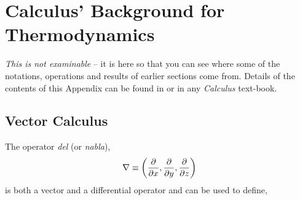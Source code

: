 
\chapter{Calculus' Background for Thermodynamics}\label{Appendix_Calculus}
{\it This is not examinable} -- it is here so that you can see where some of the notations, operations and results of earlier sections come from. Details of the contents of this Appendix can be found in \cite{Leithold_Book,Kallo_1955,Strang_Book} or in any {\it Calculus} text-book.
\bigskip

\section{Vector Calculus}

The operator {\it del} (or {\it nabla}),\index{$\nabla$}
\begin{displaymath}
  \nabla \equiv \left(\displaystyle\frac{\partial}{\partial x}, \frac{\partial}{\partial y}, \frac{\partial}{\partial z}\right)
\end{displaymath} 
is both a vector and a differential operator and can be used to define,
